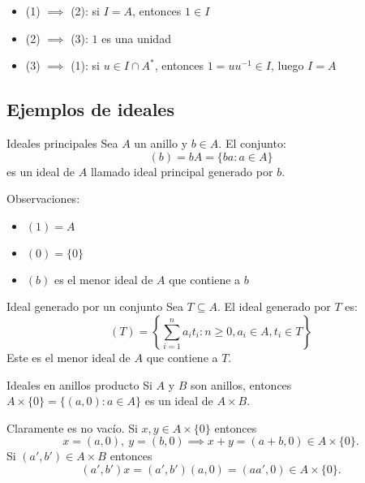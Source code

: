 \begin{proofbox}
    \begin{itemize}
        \item (1) \(\implies\) (2): si \(I = A\), entonces \(1 \in I\)
        \item (2) \(\implies\) (3): \(1\) es una unidad
        \item (3) \(\implies\) (1): si \(u \in I \cap A^*\), entonces \(1 = uu^{-1} \in I\), luego \(I = A\)
    \end{itemize}
\end{proofbox}

\subsection{Ejemplos de ideales}

\begin{example}{Ideales principales}{}
    Sea \(A\) un anillo y \(b \in A\). El conjunto:
    \[
    (b) = bA = \{ba : a \in A\}
    \]
    es un ideal de \(A\) llamado {ideal principal generado por \(b\)}.
    
    Observaciones:
    \begin{itemize}
        \item \((1) = A\)
        \item \((0) = \{0\}\)
        \item \((b)\) es el menor ideal de \(A\) que contiene a \(b\)
    \end{itemize}
\end{example}

\begin{example}{Ideal generado por un conjunto}{}
    Sea \(T \subseteq A\). El {ideal generado por \(T\)} es:
    \[
    (T) = \left\{\sum_{i=1}^n a_i t_i : n \geq 0, a_i \in A, t_i \in T\right\}
    \]
    Este es el menor ideal de \(A\) que contiene a \(T\).
\end{example}

\begin{example}{Ideales en anillos producto}{}
    Si \(A\) y \(B\) son anillos, entonces \(A \times \{0\} = \{(a, 0) : a \in A\}\) es un ideal de \(A \times B\).
\end{example}

\begin{proofbox}
    Claramente es no vacío. Si $x,y \in A \times \{0\}$ entonces 
    \[
    x = (a,0),\ y = (b,0) \implies x + y = (a+b, 0) \in A \times \{0\}.
    \]
    Si $(a',b') \in A \times B$ entonces 
    \[
    (a',b')x = (a',b')(a,0) = (aa',0) \in A \times \{0\}.
    \]
\end{proofbox}


